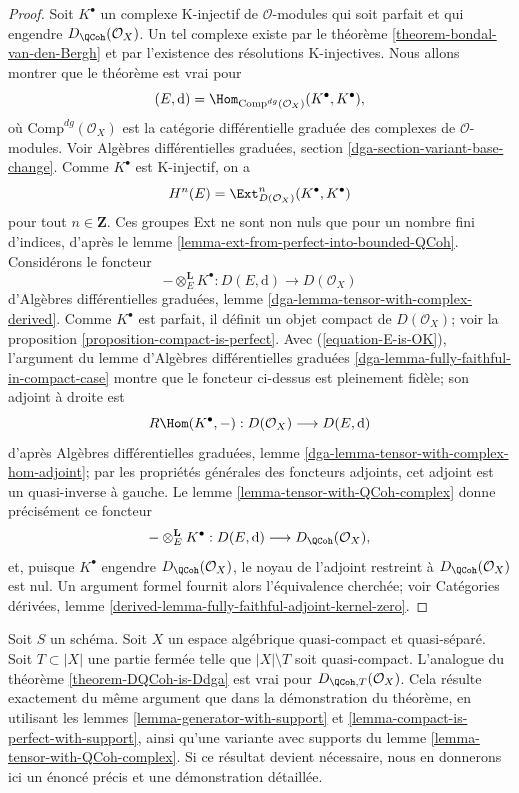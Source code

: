 \begin{proof}
Soit $K^\bullet$ un complexe K-injectif de $\mathcal{O}$-modules qui soit
parfait et qui engendre $D_\QCoh(\mathcal{O}_X)$. Un tel complexe existe par le
th\'eor\`eme \ref{theorem-bondal-van-den-Bergh} et par l'existence des
r\'esolutions K-injectives. Nous allons montrer que le th\'eor\`eme est vrai pour
$$
(E, \text{d}) = \Hom_{\text{Comp}^{dg}(\mathcal{O}_X)}(K^\bullet, K^\bullet),
$$
o\`u $\text{Comp}^{dg}(\mathcal{O}_X)$ est la cat\'egorie diff\'erentielle
gradu\'ee des complexes de $\mathcal{O}$-modules. Voir Alg\`ebres
diff\'erentielles gradu\'ees, section
\ref{dga-section-variant-base-change}. Comme $K^\bullet$ est K-injectif, on a
\begin{equation}
\label{equation-E-is-OK}
H^n(E) = \Ext^n_{D(\mathcal{O}_X)}(K^\bullet, K^\bullet)
\end{equation}
pour tout $n\in\mathbf{Z}$. Ces groupes Ext ne sont non nuls
que pour un nombre fini d'indices, d'apr\`es le lemme \ref{lemma-ext-from-perfect-into-bounded-QCoh}.
Consid\'erons le foncteur
$$
- \otimes_E^\mathbf{L} K^\bullet :
D(E, \text{d}) \longrightarrow D(\mathcal{O}_X)
$$
d'Alg\`ebres diff\'erentielles gradu\'ees, lemme
\ref{dga-lemma-tensor-with-complex-derived}. Comme
$K^\bullet$ est parfait, il d\'efinit un objet compact de
$D(\mathcal{O}_X)$; voir la proposition \ref{proposition-compact-is-perfect}.
Avec (\ref{equation-E-is-OK}), l'argument du lemme d'Alg\`ebres diff\'erentielles
gradu\'ees \ref{dga-lemma-fully-faithful-in-compact-case} montre que le foncteur
ci-dessus est pleinement fid\`ele; son adjoint \`a droite est
$$
R\Hom(K^\bullet, - ) : D(\mathcal{O}_X) \longrightarrow D(E, \text{d})
$$
d'apr\`es Alg\`ebres diff\'erentielles gradu\'ees, lemme
\ref{dga-lemma-tensor-with-complex-hom-adjoint}; par les propri\'et\'es g\'en\'erales
des foncteurs adjoints, cet adjoint est un quasi-inverse \`a gauche. Le lemme
\ref{lemma-tensor-with-QCoh-complex} donne pr\'ecis\'ement ce foncteur
$$
- \otimes_E^\mathbf{L} K^\bullet :
D(E, \text{d}) \longrightarrow D_\QCoh(\mathcal{O}_X),
$$
et, puisque $K^\bullet$ engendre $D_\QCoh(\mathcal{O}_X)$, le noyau de
l'adjoint restreint \`a $D_\QCoh(\mathcal{O}_X)$ est nul. Un argument formel
fournit alors l'\'equivalence cherch\'ee; voir Cat\'egories d\'eriv\'ees, lemme
\ref{derived-lemma-fully-faithful-adjoint-kernel-zero}.
\end{proof}

\begin{remark}
\label{remark-DQCoh-is-Ddga-with-support}
Soit $S$ un sch\'ema. Soit $X$ un espace alg\'ebrique quasi-compact et
quasi-s\'epar\'e. Soit $T\subset|X|$ une partie ferm\'ee telle que
$|X|\setminus T$ soit quasi-compact. L'analogue du th\'eor\`eme
\ref{theorem-DQCoh-is-Ddga} est vrai pour
$D_{\QCoh,T}(\mathcal{O}_X)$. Cela r\'esulte exactement du m\^eme argument que
dans la d\'emonstration du th\'eor\`eme, en utilisant les lemmes
\ref{lemma-generator-with-support} et
\ref{lemma-compact-is-perfect-with-support}, ainsi qu'une variante avec
supports du lemme \ref{lemma-tensor-with-QCoh-complex}. Si ce r\'esultat devient
n\'ecessaire, nous en donnerons ici un \'enonc\'e pr\'ecis et une d\'emonstration
d\'etaill\'ee.
\end{remark}

